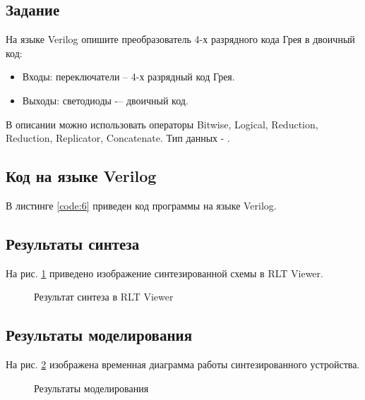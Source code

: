 \subsection{Задание}

На языке Verilog опишите преобразователь 4-х разрядного кода Грея в двоичный код:
\begin{itemize}
	\item Входы: переключатели  -- 4-х разрядный код Грея.
	\item Выходы: светодиоды  -– двоичный код.
\end{itemize}

В описании можно использовать операторы Bitwise, Logical, Reduction, Reduction, Replicator, Concatenate. Тип данных - .

\subsection{Код на языке Verilog}

В листинге \ref{code:6} приведен код программы на языке Verilog.

%

\subsection{Результаты синтеза}

На рис. \ref{fig:elab3_2_rtl} приведено изображение синтезированной схемы в RLT Viewer.

\begin{figure}[H]
\begin{center}
	\caption{Результат синтеза в RLT Viewer}
	\label{fig:elab3_2_rtl}
\end{center}
\end{figure}

\subsection{Результаты моделирования}
\label{sec:elab3_2_modeling}

На рис. \ref{fig:elab3_2_modeling} изображена временная диаграмма работы синтезированного устройства.

\begin{figure}[H]
\begin{center}
	\caption{Результаты моделирования}
	\label{fig:elab3_2_modeling}
\end{center}
\end{figure}

